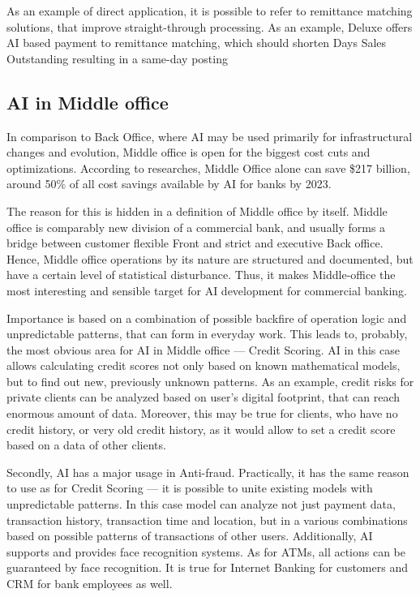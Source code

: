 As an example of direct application, it is possible to refer to remittance matching solutions, that improve straight-through processing.
As an example, Deluxe offers AI based payment to remittance matching, which should shorten Days Sales Outstanding resulting in a same-day posting
\cite{deluxe_ai_remittance}



\subsection{AI in Middle office}

In comparison to Back Office, where AI may be used primarily for infrastructural changes and evolution, Middle office is open for the biggest cost cuts and optimizations.
According to researches, Middle Office alone can save \$217 billion, around 50\% of all cost savings available by AI for banks by 2023.
\cite{trillion_opportunity}

The reason for this is hidden in a definition of Middle office by itself.
Middle office is comparably new division of a commercial bank, and usually forms a bridge between customer flexible Front and strict and executive Back office.
Hence, Middle office operations by its nature are structured and documented, but have a certain level of statistical disturbance.
Thus, it makes Middle-office the most interesting and sensible target for AI development for commercial banking.

Importance is based on a combination of possible backfire of operation logic and unpredictable patterns, that can form in everyday work.
This leads to, probably, the most obvious area for AI in Middle office — Credit Scoring.
AI in this case allows calculating credit scores not only based on known mathematical models, but to find out new, previously unknown patterns.
As an example, credit risks for private clients can be analyzed based on user's digital footprint, that can reach enormous amount of data.
Moreover, this may be true for clients, who have no credit history, or very old credit history, as it would allow to set a credit score based on a data of other clients.

Secondly, AI has a major usage in Anti-fraud.
Practically, it has the same reason to use as for Credit Scoring — it is possible to unite existing models with unpredictable patterns.
In this case model can analyze not just payment data, transaction history, transaction time and location, but in a various combinations based on possible patterns of transactions of other users.
Additionally, AI supports and provides face recognition systems.
As for ATMs, all actions can be guaranteed by face recognition.
It is true for Internet Banking for customers and CRM for bank employees as well.

